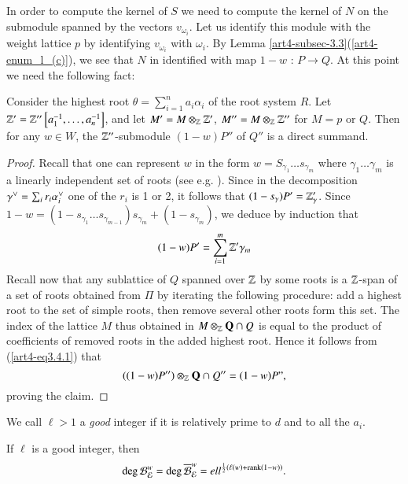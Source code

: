 \subsection{}\label{art4-subsec-3.4}
In order to compute the kernel of $S$ we need to compute the kernel of $N$ on the submodule spanned by the vectors $v_{\omega_{i}}$. Let us identify this module with the weight lattice $p$ by identifying $v_{\omega_{i}}$ with $\omega_{i}$. By Lemma \ref{art4-subsec-3.3}(\ref{art4-enum_l_(c)}), we see that $N$ in identified with map $1-w$ : $P\rightarrow Q$. At this point we need the following fact:

\begin{lemma*}
Consider the highest root $\theta =\sum_{i=1}^{n}a_{i}\alpha_{i}$ of the root system $R$. Let $\mathbb{Z}' = \mathbb{Z}''\left[a_{1}^{-1}, \ldots, a_{n}^{-1}\right]$, and let $M' = M \otimes_{\mathbb{Z}}\mathbb{Z}'$, $M'' = M\otimes_{\mathbb{Z}}\mathbb{Z}''$ for $M=p$ or $Q$. Then for any $w \in W$, the $\mathbb{Z}''$-submodule $(1-w)P''$ of $Q''$ is a direct summand.
\end{lemma*}

\begin{proof}
Recall that one can represent $w$ in the form $w=S_{\gamma_{1}}\ldots s_{\gamma_{m}}$ where $\gamma_{1} \ldots \gamma_{m}$ is a linearly independent set of roots (see e.g. \cite{art4-keyC}). Since in the decomposition
$\gamma\spcheck =\sum_{i}r_{i}\alpha_{i}\spcheck$ one of the $r_{i}$ is 1 or 2, it follows that $(1-s_{\gamma})P' = \mathbb{Z}'_{\gamma}$. Since $1-w = (1-s_{\gamma_{1}}\ldots s_{\gamma_{m-1}})s_{\gamma_{m}} + (1-s_{\gamma_{m}})$, we deduce by induction that
\begin{equation}
(1-w)P' = \sum\limits_{i=1}^{m}\mathbb{Z}'\gamma_{m}\label{art4-eq3.4.1}
\end{equation}
Recall now that any sublattice of $Q$ spanned over $\mathbb{Z}$ by some roots is a $\mathbb{Z}$-span of a set of roots obtained from $\Pi$ by iterating the following procedure: add a highest root to the set of simple roots, then remove several other roots form this set. The index of the lattice $M$ thus obtained in $M\otimes_{\mathbb{Z}}\mathbf{Q} \cap Q$ is equal to the product of coefficients of removed roots in the added highest root. Hence it follows from (\ref{art4-eq3.4.1}) that
$$
((1-w)P'')\otimes_{\mathbb{Z}} \mathbf{Q} \cap Q'' = (1-w)P",
$$
proving the claim.
\end{proof}

We call $\ell > 1$ a \textit{good} integer if it is relatively prime to $d$ and to all the $a_{i}$.

\begin{theorem*}
If $\ell$ is a good integer, then
$$
\deg\mathcal{B}_{\mathcal{E}}^{w} = \deg\overline{\mathcal{B}}_{\mathcal{E}}^{w} = ell^{\frac{1}{2}(\ell(w)+\operatorname{rank}(1-w))}.
$$
\end{theorem*}

